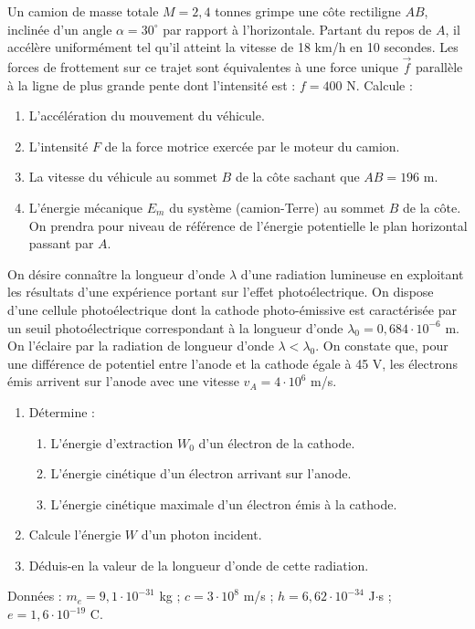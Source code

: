 \documentclass[11pt]{article}
\begin{document}
Un camion de masse totale $M = 2{,}4$ tonnes grimpe une côte rectiligne $AB$, inclinée d'un angle $\alpha = 30^\circ$ par rapport à l'horizontale. Partant du repos de $A$, il accélère uniformément tel qu'il atteint la vitesse de 18 km/h en 10 secondes. Les forces de frottement sur ce trajet sont équivalentes à une force unique $\vec{f}$ parallèle à la ligne de plus grande pente dont l'intensité est : $f = 400$ N. Calcule :

\begin{enumerate}[label=\alph*.]
  \item L'accélération du mouvement du véhicule.
  \item L'intensité $F$ de la force motrice exercée par le moteur du camion.
  \item La vitesse du véhicule au sommet $B$ de la côte sachant que $AB = 196$ m.
  \item L'énergie mécanique $E_m$ du système (camion-Terre) au sommet $B$ de la côte. On prendra pour niveau de référence de l'énergie potentielle le plan horizontal passant par $A$.
\end{enumerate}

On désire connaître la longueur d'onde $\lambda$ d'une radiation lumineuse en exploitant les résultats d'une expérience portant sur l'effet photoélectrique. On dispose d'une cellule photoélectrique dont la cathode photo-émissive est caractérisée par un seuil photoélectrique correspondant à la longueur d'onde $\lambda_0 = 0{,}684\cdot10^{-6}$ m. On l'éclaire par la radiation de longueur d'onde $\lambda < \lambda_0$. On constate que, pour une différence de potentiel entre l'anode et la cathode égale à 45 V, les électrons émis arrivent sur l'anode avec une vitesse $v_A = 4\cdot10^6$ m/s.

\begin{enumerate}
  \item Détermine :
  \begin{enumerate}[label=\alph*.]
    \item L'énergie d'extraction $W_0$ d'un électron de la cathode.
    \item L'énergie cinétique d'un électron arrivant sur l'anode.
    \item L'énergie cinétique maximale d'un électron émis à la cathode.
  \end{enumerate}
  \item Calcule l'énergie $W$ d'un photon incident.
  \item Déduis-en la valeur de la longueur d'onde de cette radiation.
\end{enumerate}
\noindent Données : $m_e = 9{,}1\cdot10^{-31}$ kg ; $c = 3\cdot10^8$ m/s ; $h = 6{,}62\cdot10^{-34}$ J$\cdot$s ; $e = 1{,}6\cdot10^{-19}$ C.
\end{document}

